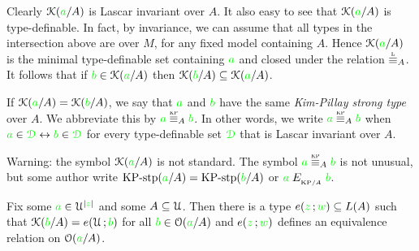 \documentclass[creche.tex]{subfiles}
\begin{document}
Clearly $\EuScript K({\color{green} a}/A)$ is Lascar invariant over $A$.  It also easy to see that $\EuScript K({\color{green} a}/A)$ is type-definable. In fact, by invariance, we can assume that all types in the intersection above are over $M$, for any fixed model containing $A$. Hence $\EuScript K({\color{green} a}/A)$ is the minimal type-definable set containing ${\color{green} a}$ and closed under the relation $\equivL_A$. It follows that if ${\color{green} b}\in\EuScript K({\color{green} a}/A)$ then $\EuScript K({\color{green} b}/A)\subseteq\EuScript K({\color{green} a}/A)$. 

If $\EuScript K({\color{green} a}/A)=\EuScript K({\color{green} b}/A)$, we say that ${\color{green} a}$ and ${\color{green} b}$ have the same  \emph{Kim-Pillay strong type\/} over $A$. We abbreviate this by \emph{${\gr a}\stackrel{\smash{\scalebox{.5}{\rm KP}}}{\equiv}_A{\gr b}$}. In other words, we write ${\gr a}\equivKP_A{\gr b}$ when ${\color{green} a}\in{\color{green}\EuScript D}\leftrightarrow{\color{green}b}\in{\color{green}\EuScript D}$ for every type-definable set ${\color{green}\EuScript D}$ that is Lascar invariant over $A$.


\noindent\llap{\textcolor{red}{\Large\danger}\kern1.5ex}Warning: the symbol $\EuScript K({\color{green} a}/A)$ is not standard. The symbol ${\gr a}\equivKP_A{\gr b}$ is not unusual, but some author write ${\rm KP{\mbox{-}}stp}({\color{green} a}/A)={\rm KP{\mbox{-}}stp}({\color{green} b}/A)$ or ${\color{green} a}\mathrel{E_{_{{\rm KP}/A}}}{\color{green} b}$.

\begin{proposition}\label{prop_bardotto}
  Fix some ${\color{green} a}\in\EuScript U^{|{\color{green} z}|}$ and some $A\subseteq\EuScript U$. Then there is a type $e({\color{green} z}\,;{\color{green} w})\subseteq L(A)$ such that $\EuScript K({\color{green} b}/A)=e(\EuScript U\,;{\color{green} b})$ for all ${\color{green} b}\in\EuScript O({\color{green} a}/A)$ and $e({\color{green} z}\,;{\color{green} w})$ defines an equivalence relation on $\EuScript O({\color{green} a}/A)$.
\end{proposition}
\end{document}
